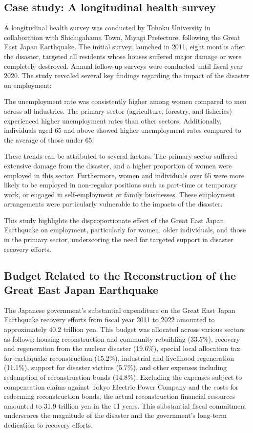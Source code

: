 \documentclass[a4paper,12pt]{article}
\begin{document}
\subsection{Case study: A longitudinal health survey}


A longitudinal health survey was conducted by Tohoku University in collaboration with Shichigahama Town, Miyagi Prefecture, following the Great East Japan Earthquake. The initial survey, launched in 2011, eight months after the disaster, targeted all residents whose houses suffered major damage or were completely destroyed. Annual follow-up surveys were conducted until fiscal year 2020. The study revealed several key findings regarding the impact of the disaster on employment:

The unemployment rate was consistently higher among women compared to men across all industries. The primary sector (agriculture, forestry, and fisheries) experienced higher unemployment rates than other sectors. Additionally, individuals aged 65 and above showed higher unemployment rates compared to the average of those under 65.

These trends can be attributed to several factors. The primary sector suffered extensive damage from the disaster, and a higher proportion of women were employed in this sector. Furthermore, women and individuals over 65 were more likely to be employed in non-regular positions such as part-time or temporary work, or engaged in self-employment or family businesses. These employment arrangements were particularly vulnerable to the impacts of the disaster.

This study highlights the disproportionate effect of the Great East Japan Earthquake on employment, particularly for women, older individuals, and those in the primary sector, underscoring the need for targeted support in disaster recovery efforts.




\subsection{Budget Related to the Reconstruction of the Great East Japan Earthquake}


The Japanese government's substantial expenditure on the Great East Japan Earthquake recovery efforts from fiscal year 2011 to 2022 amounted to approximately 40.2 trillion yen. This budget was allocated across various sectors as follows: housing reconstruction and community rebuilding (33.5\%), recovery and regeneration from the nuclear disaster (19.6\%), special local allocation tax for earthquake reconstruction (15.2\%), industrial and livelihood regeneration (11.1\%), support for disaster victims (5.7\%), and other expenses including redemption of reconstruction bonds (14.8\%). Excluding the expenses subject to compensation claims against Tokyo Electric Power Company and the costs for redeeming reconstruction bonds, the actual reconstruction financial resources amounted to 31.9 trillion yen in the 11 years. This substantial fiscal commitment underscores the magnitude of the disaster and the government's long-term dedication to recovery efforts.
\end{document}
